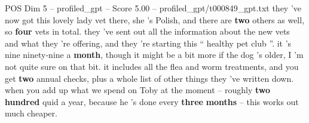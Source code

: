 \begin{textsample}{POS Dim 5 – profiled\_gpt – Score 5.00 – profiled\_gpt/t000849\_gpt.txt}  \label{ex:f5_pos_023}
they 've now got this lovely lady vet there, she ’s Polish, and there are \textbf{two} others as well, so \textbf{four} vets in total. they ’ve sent out all the information about the new vets and what they ’re offering, and they ’re starting this “ healthy pet club ”. it ’s nine ninety‑nine a \textbf{month}, though it might be a bit more if the dog ’s older, I ’m not quite sure on that bit. it includes all the flea and worm treatments, and you get \textbf{two} annual checks, plus a whole list of other things they ’ve written down. when you add up what we spend on Toby at the moment – roughly \textbf{two} \textbf{hundred} quid a year, because he ’s done every \textbf{three} \textbf{months} – this works out much cheaper.

\end{textsample}

